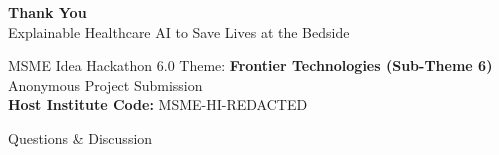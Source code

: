 \documentclass[aspectratio=169, 11pt]{beamer}
\begin{document}
\begin{frame}[plain]
    
    \centering
    \vspace{1.2cm}
    {\Huge \textbf{\textcolor{neonCyan}{Thank You}}} \\
    \vspace{0.4cm}
    {\large \textcolor{textColor!80}{Explainable Healthcare AI to Save Lives at the Bedside}} \\
    \vspace{0.8cm}
    
    \begin{minipage}{0.75\textwidth}
        \begin{block}{MSME Idea Hackathon 6.0}
            \centering
            \scriptsize
            Theme: \textbf{Frontier Technologies (Sub-Theme 6)} \\
            \vspace{0.1cm}
            \textcolor{mutedText}{Anonymous Project Submission} \\
            \textbf{Host Institute Code:} MSME-HI-REDACTED
        \end{block}
    \end{minipage}
    
    \vspace{0.4cm}
    {\normalsize \textcolor{neonTeal}{Questions \& Discussion}}
\end{frame}
\end{document}
